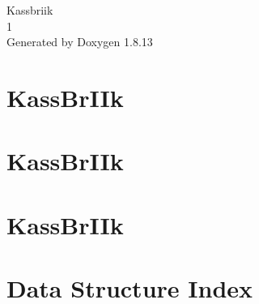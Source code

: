 \documentclass[twoside]{book}
\newcommand{\+}{\discretionary{\mbox{\scriptsize$\hookleftarrow$}}{}{}}
\newcommand{\clearemptydoublepage}{%
  \newpage{\pagestyle{empty}\cleardoublepage}%
}
\begin{document}
\hypersetup{pageanchor=false,
             bookmarksnumbered=true,
             pdfencoding=unicode
            }
\begin{titlepage}
\vspace*{7cm}
\begin{center}%
{\Large Kassbriik \\[1ex]\large 1 }\\
\vspace*{1cm}
{\large Generated by Doxygen 1.8.13}\\
\end{center}
\end{titlepage}
\clearemptydoublepage
{}
\tableofcontents
\clearemptydoublepage
{}
\hypersetup{pageanchor=true}

\chapter{Kass\+Br\+I\+Ik}
\label{md__home_lafie-rage__cours__l_a1__p_r_s__g_i_t__p_r_o_j_e_t_s__p_r_s__projet__brick_breaker__b_r__r_e_a_d_m_e_8en}

\chapter{Kass\+Br\+I\+Ik}
\label{md__home_lafie-rage__cours__l_a1__p_r_s__g_i_t__p_r_o_j_e_t_s__p_r_s__projet__brick_breaker__b_r__r_e_a_d_m_e_8fr}

\chapter{Kass\+Br\+I\+Ik}
\label{md__home_lafie-rage__cours__l_a1__p_r_s__g_i_t__p_r_o_j_e_t_s__p_r_s__projet__brick_breaker__b_r__r_e_a_d_m_e}

\chapter{Data Structure Index}

\end{document}
